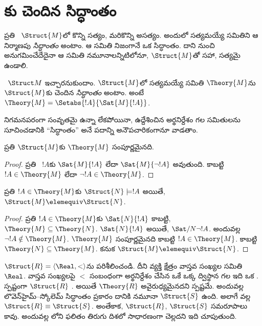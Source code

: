 \documentclass[../../../include/open-logic-section]{subfiles}
\begin{document}

\section{కు చెందిన సిద్ధాంతం}

ప్రతి ~$\Struct{M}$లో కొన్ని
 సత్యం, మరికొన్ని అసత్యం. అందులో
సత్యమయ్యే  సమితిని ఆ నిర్మాణపు
\emph{సిద్ధాంతం} అంటాం. ఆ సమితి నిజంగానే ఒక సిద్ధాంతం. దాని నుంచి
అనుగమించేదేదైనా ఆ సమితి నమూనాలన్నిటిలోనూ, $\Struct{M}$తో సహా,
సత్యమై ఉండాలి.

\begin{defn}
  ~$\Struct M$ ఇచ్చారనుకుందాం.
  $\Struct{M}$లో సత్యమయ్యే  సమితి
  $\Theory{M}$ను $\Struct{M}$కు చెందిన \emph{సిద్ధాంతం} అంటాం. అంటే
  $\Theory{M} = \Setabs{!A}{\Sat{M}{!A}}$.
\end{defn}

నిగమనపరంగా సంవృతమై ఉన్నా లేకపోయినా, ఉద్దేశించిన అర్థనిర్దేశం గల
 సమితులను సూచించడానికి “సిద్ధాంతం” అనే పదాన్ని
అనౌపచారికంగానూ వాడతాం.

\begin{prop}
ప్రతి $\Struct{M}$కు $\Theory{M}$ సంపూర్ణమైనది.
\end{prop}

\begin{proof}
ప్రతి ~$!A$కు $\Sat{M}{!A}$ లేదా
$\Sat{M}{\lnot !A}$ అవుతుంది. కాబట్టి $!A \in \Theory{M}$ లేదా
$\lnot !A \in \Theory{M}$.
\end{proof}

\begin{prop}
  ప్రతి $!A \in \Theory{M}$కు $\Struct{N} \models !A$ అయితే,
  $\Struct{M} \elemequiv \Struct{N}$.
\end{prop}

\begin{proof}
ప్రతి $!A \in \Theory{M}$కు $\Sat{N}{!A}$ కాబట్టి,
$\Theory{M} \subseteq \Theory{N}$. $\Sat{N}{!A}$ అయితే,
$\Sat/{N}{\lnot !A}$. అందువల్ల $\lnot !A \notin \Theory{M}$.
$\Theory{M}$ సంపూర్ణమైనది కాబట్టి $!A \in \Theory{M}$. కాబట్టి
$\Theory{N} \subseteq \Theory{M}$. కనుక
$\Struct{M} \elemequiv \Struct{N}$.
\end{proof}

\begin{rem}
  $\Struct{R} = \langle\Real, <\rangle$ను పరిశీలించండి. దీని
  వ్యక్తి క్షేత్రం వాస్తవ సంఖ్యల సమితి $\Real$. వాస్తవ
  సంఖ్యలపై $<$ సంబంధంగా అర్థనిర్దేశం చేసిన ఒకే ఒక్క ద్విస్థాన
   గల  ఇది ఒక
  . స్పష్టంగా $\Struct{R}$
  . అయితే $\Theory{R}$ అవైరుధ్యమైనదని స్పష్టమే.
  అందువల్ల లొవెన్‌హైమ్--స్కోలెమ్ సిద్ధాంతం ప్రకారం దానికి
   నమూనా $\Struct{S}$ ఉంది. అలాగే
   వల్ల $\Struct{R} \equiv \Struct{S}$. అంతేకాక,
  $\Struct{R}$, $\Struct{S}$ సమరూపాలు కావు. అందువల్ల
  లోని ఫలితం తిరుగు దిశలో సాధారణంగా
  చెల్లదని ఇది చూపుతుంది.
\end{rem}
\end{document}
